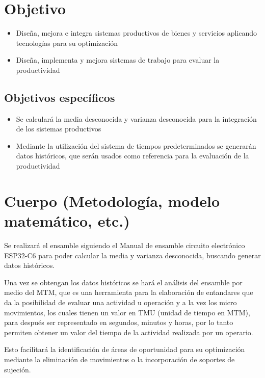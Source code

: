     \section{Objetivo}
    \begin{itemize}
        \item Diseña, mejora e integra sistemas productivos de bienes y servicios aplicando tecnologías para su optimización
        \item Diseña, implementa y mejora sistemas de trabajo para evaluar la productividad
    \end{itemize}
    
    \subsection{Objetivos específicos }
    
    \begin{itemize}
    
    \item Se calculará la media desconocida y varianza desconocida para la integración de los sistemas productivos
    \item Mediante la utilización del sistema de tiempos predeterminados se generarán datos históricos, que serán usados como referencia para la evaluación de la productividad
    
    \end{itemize}
    \section{Cuerpo (Metodología, modelo matemático, etc.)}
    
     Se realizará el ensamble siguiendo el Manual de ensamble circuito electrónico ESP32-C6 para poder calcular la media y varianza desconocida, buscando generar datos históricos. 
    
     Una vez se obtengan los datos históricos se hará el análisis del ensamble por medio del MTM, que es una herramienta para la elaboración de entandares que da la posibilidad de evaluar una actividad u operación y a la vez los micro movimientos, los cuales tienen un valor en TMU (unidad de tiempo en MTM), para después ser representado en segundos, minutos y horas, por lo tanto permiten obtener un valor del tiempo de la actividad realizada por un operario.\cite{navarro2006estandarizacion}
    
    Esto facilitará la identificación de áreas de oportunidad para su optimización mediante la eliminación de movimientos o la incorporación de soportes de sujeción. 
    

